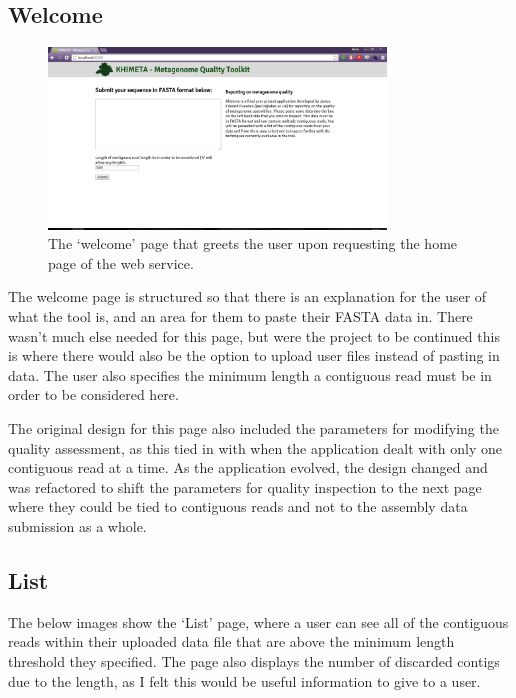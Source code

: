 \subsection{Welcome}
\begin{figure}[H]
\centering
\includegraphics[width=0.8\textwidth]{images/ui1}
\caption{The `welcome' page that greets the user upon requesting the home page of the web service.}
\end{figure}

The welcome page is structured so that there is an explanation for the user of what the tool is, and an area for them to paste their FASTA data in. There wasn't much else needed for this page, but were the project to be continued this is where there would also be the option to upload user files instead of pasting in data. The user also specifies the minimum length a contiguous read must be in order to be considered here.

The original design for this page also included the parameters for modifying the quality assessment, as this tied in with when the application dealt with only one contiguous read at a time. As the application evolved, the design changed and was refactored to shift the parameters for quality inspection to the next page where they could be tied to contiguous reads and not to the assembly data submission as a whole.

\subsection{List}
The below images show the `List' page, where a user can see all of the contiguous reads within their uploaded data file that are above the minimum length threshold they specified. The page also displays the number of discarded contigs due to the length, as I felt this would be useful information to give to a user.

